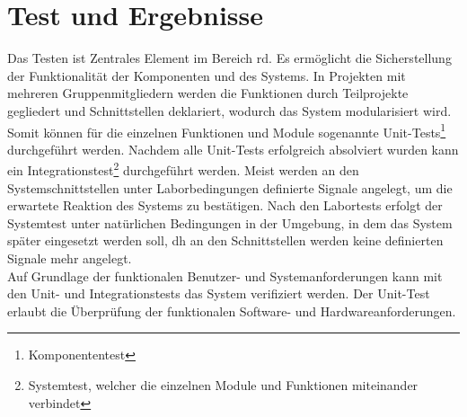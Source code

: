 \chapter{Test und Ergebnisse}
Das Testen ist Zentrales Element im Bereich \ac{rd}. Es ermöglicht die Sicherstellung der Funktionalität der Komponenten und des Systems. In Projekten mit mehreren Gruppenmitgliedern werden die Funktionen durch Teilprojekte gegliedert und Schnittstellen deklariert, wodurch das System modularisiert wird. Somit können für die einzelnen Funktionen und Module sogenannte Unit-Tests\footnote{Komponententest} durchgeführt werden. Nachdem alle Unit-Tests erfolgreich absolviert wurden kann ein Integrationstest\footnote{Systemtest, welcher die einzelnen Module und Funktionen miteinander verbindet} durchgeführt werden. Meist werden an den Systemschnittstellen unter Laborbedingungen definierte Signale angelegt, um die erwartete Reaktion des Systems zu bestätigen. Nach den Labortests erfolgt der Systemtest unter natürlichen Bedingungen in der Umgebung, in dem das System später eingesetzt werden soll, \ac{dh} an den Schnittstellen werden keine definierten Signale mehr angelegt.\\
Auf Grundlage der funktionalen Benutzer- und Systemanforderungen kann mit den Unit- und Integrationstests das System verifiziert werden. Der Unit-Test erlaubt die Überprüfung der funktionalen Software- und Hardwareanforderungen.
